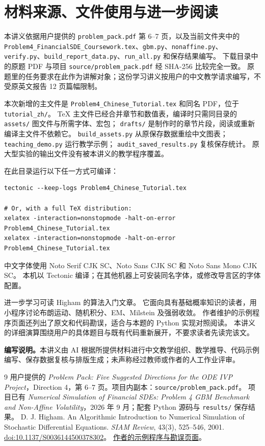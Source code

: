 \documentclass[11pt,a4paper,fontset=none]{ctexart}
\numberwithin{equation}{section}
\begin{document}
\section{材料来源、文件使用与进一步阅读}\label{sec:sources}
本讲义依据用户提供的 \texttt{problem\_pack.pdf} 第 6--7 页，以及当前文件夹中的
\nolinkurl{Problem4_FinancialSDE_Coursework.tex}、\texttt{gbm.py}、\texttt{nonaffine.py}、
\texttt{verify.py}、\texttt{build\_report\_data.py}、\texttt{run\_all.py} 和保存结果编写。
下载目录中的原题 PDF 与项目 \texttt{source/problem\_pack.pdf} 经 SHA-256 比较完全一致。
原题里的任务要求在此作为讲解对象；这份学习讲义按用户的中文教学请求编写，不受原英文报告 12 页篇幅限制。

本次新增的主文件是 \texttt{Problem4\_Chinese\_Tutorial.tex} 和同名 PDF，位于 \texttt{tutorial\_zh/}。
TeX 主文件已经合并章节和数值表，编译时只需同目录的 \texttt{assets/} 图文件与所需字体、宏包；
\texttt{drafts/} 是制作时的章节片段，阅读或重新编译主文件不依赖它。
\texttt{build\_assets.py} 从原保存数据重绘中文图表；\texttt{teaching\_demo.py} 运行教学示例；
\texttt{audit\_saved\_results.py} 复核保存统计。
原大型实验的输出文件没有被本讲义的教学程序覆盖。

在此目录运行以下任一方式可编译：
\begin{lstlisting}[language={}]
tectonic --keep-logs Problem4_Chinese_Tutorial.tex

# Or, with a full TeX distribution:
xelatex -interaction=nonstopmode -halt-on-error Problem4_Chinese_Tutorial.tex
xelatex -interaction=nonstopmode -halt-on-error Problem4_Chinese_Tutorial.tex
\end{lstlisting}
中文字体使用 Noto Serif CJK SC、Noto Sans CJK SC 和 Noto Sans Mono CJK SC。
本机以 Tectonic 编译；在其他机器上可安装同名字体，或修改导言区的字体配置。

进一步学习可读 Higham 的算法入门文章\cite{higham}。
它面向具有基础概率知识的读者，用小程序讨论布朗运动、随机积分、EM、Milstein 及强弱收敛。
作者维护的示例程序页面还列出了原文和代码勘误，适合与本题的 Python 实现对照阅读。
本讲义的详细演算围绕用户的具体题目与既有代码重新展开，不要求读者先读完该文。

\noindent\textbf{编写说明。}本讲义由 AI 根据所提供材料进行中文教学组织、数学推导、代码示例编写、保存数据复核与排版生成；未声称经过教师或作者的人工作业评审。

\begin{thebibliography}{9}
 用户提供的 \emph{Problem Pack: Five Suggested Directions for the ODE IVP Project}，Direction 4，第 6--7 页。项目内副本：\texttt{source/problem\_pack.pdf}。
 项目已有 \emph{Numerical Simulation of Financial SDEs: Problem 4 GBM Benchmark and Non-Affine Volatility}，2026 年 9 月；配套 Python 源码与 \texttt{results/} 保存结果。
 D. J. Higham. An Algorithmic Introduction to Numerical Simulation of Stochastic Differential Equations. \emph{SIAM Review}, 43(3), 525--546, 2001.
\href{https://doi.org/10.1137/S0036144500378302}{doi:10.1137/S0036144500378302}。
\href{https://webhomes.maths.ed.ac.uk/~dhigham/algfiles.html}{作者的示例程序与勘误页面}。
\end{thebibliography}
\end{document}
